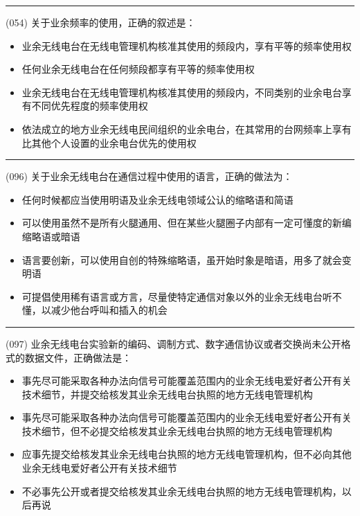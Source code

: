 \documentclass[twocolumn,hyperref,UTF8]{ctexart}  %
\begin{document}
\noindent\rule{0.5\textwidth}{1pt}
\heiti (054) 关于业余频率的使用，正确的叙述是： \songti {\color{gray} [LK0049] }
\begin{itemize}
	\item  业余无线电台在无线电管理机构核准其使用的频段内，享有平等的频率使用权
	\item  任何业余无线电台在任何频段都享有平等的频率使用权
	\item  业余无线电台在无线电管理机构核准其使用的频段内，不同类别的业余电台享有不同优先程度的频率使用权
	\item  依法成立的地方业余无线电民间组织的业余电台，在其常用的台网频率上享有比其他个人设置的业余电台优先的使用权
\end{itemize}




\noindent\rule{0.5\textwidth}{1pt}
\heiti (096) 关于业余无线电台在通信过程中使用的语言，正确的做法为： \songti {\color{gray} [LK0060] }
\begin{itemize}
	\item  任何时候都应当使用明语及业余无线电领域公认的缩略语和简语
	\item  可以使用虽然不是所有火腿通用、但在某些火腿圈子内部有一定可懂度的新编缩略语或暗语
	\item  语言要创新，可以使用自创的特殊缩略语，虽开始时象是暗语，用多了就会变明语
	\item  可提倡使用稀有语言或方言，尽量使特定通信对象以外的业余无线电台听不懂，以减少他台呼叫和插入的机会
\end{itemize}


\noindent\rule{0.5\textwidth}{1pt}
\heiti (097) 业余无线电台实验新的编码、调制方式、数字通信协议或者交换尚未公开格式的数据文件，正确做法是： \songti {\color{gray} [LK0061] }
\begin{itemize}
	\item  事先尽可能采取各种办法向信号可能覆盖范围内的业余无线电爱好者公开有关技术细节，并提交给核发其业余无线电台执照的地方无线电管理机构
	\item  事先尽可能采取各种办法向信号可能覆盖范围内的业余无线电爱好者公开有关技术细节，但不必提交给核发其业余无线电台执照的地方无线电管理机构
	\item  应事先提交给核发其业余无线电台执照的地方无线电管理机构，但不必向其他业余无线电爱好者公开有关技术细节
	\item  不必事先公开或者提交给核发其业余无线电台执照的地方无线电管理机构，以后再说
\end{itemize}
\end{document}
